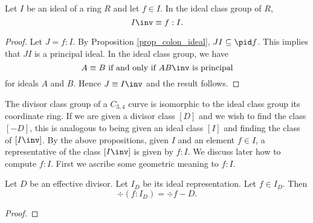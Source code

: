 \begin{proposition}
  Let $I$ be an ideal of a ring $R$ and let $f \in I$.
  In the ideal class group of $R$,
    \[ I\inv \equiv f : I. \]
\end{proposition}
\begin{proof}
  Let $J = f : I$.
  By Proposition \ref{prop_colon_ideal}, $JI \subseteq \pid f$.
  This implies that $JI$ is a principal ideal.
  In the ideal class group, we have
    \[ A \equiv B \text{ if and only if } AB\inv \text{ is principal} \]
  for ideals $A$ and $B$.
  Hence $J \equiv I\inv$ and the result follows.
\end{proof}

The divisor class group of a $C_{3,4}$ curve is isomorphic to the ideal class group its coordinate ring.
If we are given a divisor class $[D]$ and we wish to find the class $[-D]$,
this is analogous to being given an ideal class $[I]$ and finding the class of $[I\inv]$.
By the above propositions, given $I$ and an element $f \in I$, a representative of the class $[I\inv]$ is given by $f : I$.
We discuss later how to compute $f : I$.
First we ascribe some geometric meaning to $f : I$.

\begin{theorem}
  Let $D$ be an effective divisor.
  Let $I_D$ be its ideal representation.
  Let $f \in I_D$.
  Then
    \[ \div(f : I_D) = \div f - D. \]
\end{theorem}
\begin{proof}
\end{proof}

